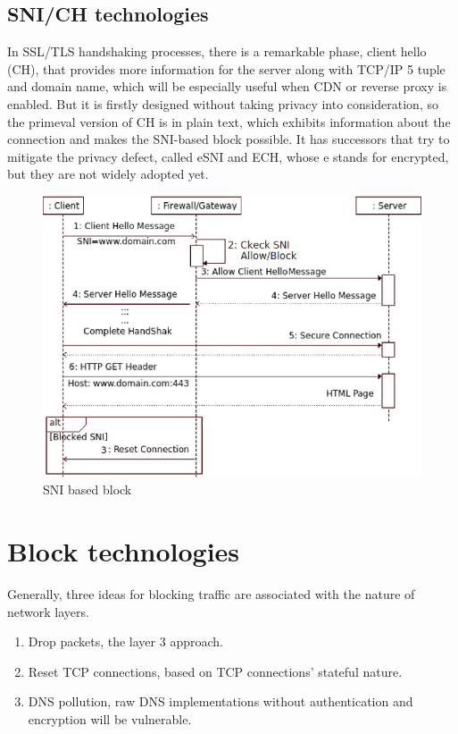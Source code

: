 \subsection{SNI/CH technologies}
\begin{frame}

    In SSL/TLS handshaking processes, there is a remarkable phase, client hello (CH), that provides more information for the server along with TCP/IP 5 tuple and domain name, which will be especially useful when CDN or reverse proxy is enabled.
    But it is firstly designed without taking privacy into consideration, so the primeval version of CH is in plain text, which exhibits information about the connection and makes the SNI-based block possible.
    It has successors that try to mitigate the privacy defect, called eSNI and ECH, whose e stands for encrypted, but they are not widely adopted yet.
    \begin{figure}
        \centering
        \includegraphics[scale=0.25]{pics/SNI_Block.png}
        \caption{\small SNI based block \cite{SNI_block}}
        \label{fig:fallback}
    \end{figure}
\end{frame}

\section{Block technologies}
\begin{frame}
    Generally, three ideas for blocking traffic are associated with the nature of network layers.
    \begin{enumerate}
        \item Drop packets, the layer 3 approach.
        \item Reset TCP connections, based on TCP connections' stateful nature.
        \item DNS pollution, raw DNS implementations without authentication and encryption will be vulnerable.
    \end{enumerate}
\end{frame}

